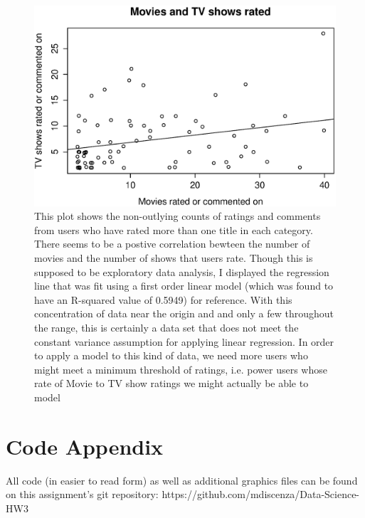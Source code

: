 \documentclass{article}
\begin{document}
\begin{figure}[H]
\begin{center}
\includegraphics[width=1\columnwidth]{getglue2.eps}
\caption{This plot shows the non-outlying counts of ratings and comments from users who have rated more than one title in each category. There seems to be a postive correlation bewteen the number of movies and the number of shows that users rate. Though this is supposed to be exploratory data analysis, I displayed the regression line that was fit using a first order linear model (which was found to have an R-squared value of 0.5949) for reference.  With this concentration of data near the origin and and only a few throughout the range, this is certainly a data set that does not meet the constant variance assumption for applying linear regression.  In order to apply a model to this kind of data, we need more users who might meet a minimum threshold of ratings, i.e. power users whose rate of Movie to TV show ratings we might actually be able to model}
\end{center}
\end{figure}



\section{Code Appendix}
All code (in easier to read form) as well as additional graphics files can be found on this assignment's git repository:
https://github.com/mdiscenza/Data-Science-HW3











\begin{small}

 
\end{small}
\end{document}
